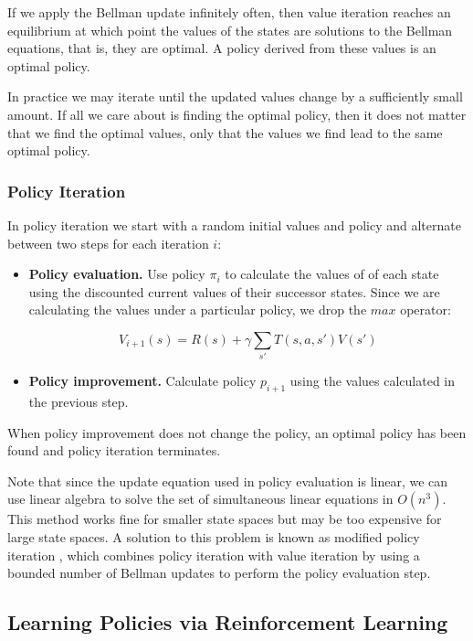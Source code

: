 If we apply the Bellman update infinitely often, then value iteration reaches an equilibrium at which point the values of the states are solutions to the Bellman equations, that is, they are optimal. A policy derived from these values is an optimal policy.

In practice we may iterate until the updated values change by a sufficiently small amount. If all we care about is finding the optimal policy, then it does not matter that we find the optimal values, only that the values we find lead to the same optimal policy.

\subsubsection{Policy Iteration}

In policy iteration \cite{howard1960dynamic} we start with a random initial values and policy and alternate between two steps for each iteration $i$:

\begin{itemize}
\item {\bf Policy evaluation.} Use policy $\pi_i$ to calculate the values of of each state using the discounted current values of their successor states. Since we are calculating the values under a particular policy, we drop the $max$ operator:

  \begin{equation}
  V_{i+1}(s) = R(s) + \gamma \sum_{s'} T(s, a, s') V(s')
  \end{equation}

\item {\bf Policy improvement.} Calculate policy $p_{i+1}$ using the values calculated in the previous step.
\end{itemize}

When policy improvement does not change the policy, an optimal policy has been found and policy iteration terminates.

Note that since the update equation used in policy evaluation is linear, we can use linear algebra to solve the set of simultaneous linear equations in $O(n^3)$. This method works fine for smaller state spaces but may be too expensive for large state spaces. A solution to this problem is known as modified policy iteration \cite{van-nunen1976set,puterman1978modified}, which combines policy iteration with value iteration by using a bounded number of Bellman updates to perform the policy evaluation step.

\subsection{Learning Policies via Reinforcement Learning}\label{sec:rl}

